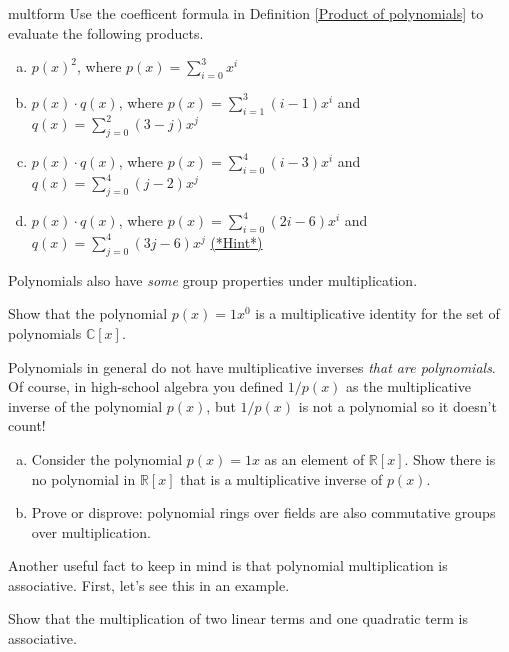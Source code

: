 \begin {exercise}{multform}
Use the coefficent formula in Definition \ref{Product of polynomials} to evaluate the following products.
\begin {enumerate}[(a)]
\item
$p(x)^2$, where $p(x) = \sum_{i=0}^{3} x^i$
\item
$p(x) \cdot q(x)$, where $p(x) = \sum_{i=1}^{3} (i-1)x^i$  and $q(x) = \sum_{j=0}^{2} (3-j)x^j$
\item
$p(x) \cdot q(x)$, where $p(x) = \sum_{i=0}^{4} (i-3)x^i$  and $q(x) = \sum_{j=0}^{4} (j-2)x^j$ 
\item
$p(x) \cdot q(x)$, where $p(x) = \sum_{i=0}^{4} (2i-6)x^i$  and $q(x) = \sum_{j=0}^{4} (3j-6)x^j$ 
\hyperref[sec:polyrings:hints]{(*Hint*)} 
\end{enumerate}
\end {exercise}


Polynomials also have \emph{some} group properties under multiplication.

\begin{exercise}{}
Show that the polynomial $p(x) = 1x^0$ is a multiplicative identity for the set of polynomials $\mathbb{C}[x]$.
\end{exercise}

Polynomials in general do not have multiplicative inverses \emph{that are polynomials}.  Of course, in high-school algebra you defined $1/p(x)$ as the multiplicative inverse of the polynomial $p(x)$, but $1/p(x)$ is not a polynomial so it doesn't count!

\begin{exercise}{}
\begin{enumerate}[(a)]
\item
Consider the  polynomial $p(x)= 1x$ as an element of $\mathbb{R}[x]$. Show there is no polynomial in $\mathbb{R}[x]$ that is a multiplicative inverse of $p(x)$.
\item
Prove or disprove: polynomial rings over fields are also commutative groups over multiplication.
\end{enumerate}
\end{exercise}

Another useful fact to keep in mind is that polynomial multiplication is associative.  First, let's see this in an example.


\begin{exercise}{}
Show that the multiplication of two linear terms and one quadratic term is associative.
\end{exercise}

